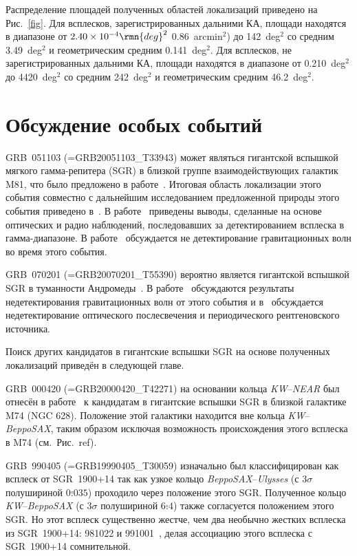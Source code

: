 Распределение площадей полученных областей локализаций приведено на Рис.~\ref{fig}.
Для всплесков, зарегистрированных дальними КА, площади находятся в диапазоне от 
$2.40 \times 10^{-4}\rmn{deg}^2$ 0.86~arcmin$^2$) до 142~deg$^2$ со средним 3.49~deg$^2$ 
и геометрическим средним 0.141~deg$^2$. Для всплесков, не зарегистрированных дальними КА, 
площади находятся в диапазоне от 0.210~deg$^2$ до 4420~deg$^2$ со средним 242~deg$^2$
и геометрическим средним 46.2~deg$^2$.

\section{Обсуждение особых событий}
GRB~051103 (=GRB20051103\_T33943) может являться гигантской вспышкой мягкого 
гамма-репитера (SGR) в близкой группе взаимодействующих галактик M81, что было 
предложено в работе~\citep{Frederiks_2007AstL}. Итоговая область локализации 
этого события совместно с дальнейшим исследованием предложенной природы этого 
события приведено в~\citep{Hurley_2010MNRAS}. В работе~\citep{Ofek_2006ApJ} 
приведены выводы, сделанные на основе оптических и радио наблюдений, последовавших 
за детектированием всплеска в гамма-диапазоне. В работе~\citep{Abadie_2012ApJ} обсуждается
не детектирование гравитационных волн во время этого события.

GRB~070201 (=GRB20070201\_T55390) вероятно является гигантской вспышкой SGR
в туманности Андромеды~\citep{Mazets_2008ApJ}. В работе~\citep{Abbott_2008ApJ} 
обсуждаются результаты недетектирования гравитационных волн от этого события 
и в~\citep{Ofek_2008ApJ} обсуждается недетектирование оптического послесвечения 
и периодического рентгеновского источника.

Поиск других кандидатов в гигантские вспышки SGR на основе полученных локализаций 
приведён в следующей главе.

GRB~000420 (=GRB20000420\_T42271) на основании кольца \textit{KW}--\textit{NEAR} 
был отнесён в работе~\citep{Ofek_2007ApJ} к кандидатам в гигантские вспышки SGR 
в близкой галактике M74 (NGC 628). Положение этой галактики находится 
вне кольца \textit{KW}--\textit{BeppoSAX}, таким образом исключая возможность 
происхождения этого всплеска в M74 (см.~Рис.~ref{}).

GRB~990405 (=GRB19990405\_T30059) изначально был классифицирован как всплеск
от SGR~1900+14 так как узкое кольцо \textit{BeppoSAX}--\textit{Ulysses} 
(с $3\sigma$ полушириной $0\overset{\circ}{.}035$) проходило через положение 
этого SGR. Полученное кольцо \textit{KW}--\textit{BeppoSAX} (с $3\sigma$ полушириной
$6\overset{\circ}{.}4$) также согласуется положением этого SGR. Но этот всплеск 
существенно жестче, чем два необычно жестких всплеска из SGR~1900+14: 
981022 и 991001~\citep{Woods_1999ApJ}, делая ассоциацию этого всплеска 
с SGR~1900+14 сомнительной.

